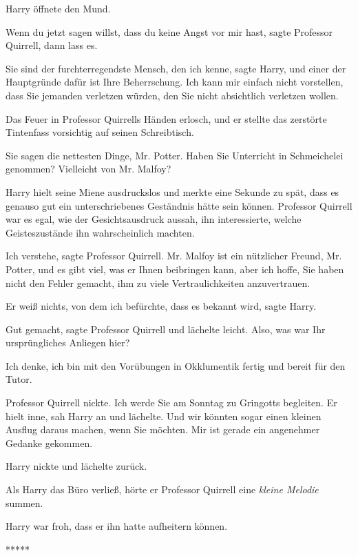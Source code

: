 Harry öffnete den Mund.

\glqq{}Wenn du jetzt sagen willst, dass du keine Angst vor mir hast\grqq{},
sagte Professor Quirrell, \glqq{}dann lass es.\grqq{}

\glqq{}Sie sind der furchterregendste Mensch, den ich kenne\grqq{}, sagte Harry,
\glqq{}und einer der Hauptgründe dafür ist Ihre Beherrschung. Ich kann mir
einfach nicht vorstellen, dass Sie jemanden verletzen würden, den Sie nicht
absichtlich verletzen wollen.\grqq{}

Das Feuer in Professor Quirrells Händen erlosch, und er stellte das zerstörte
Tintenfass vorsichtig auf seinen Schreibtisch.

\glqq{}Sie sagen die nettesten Dinge, Mr. Potter. Haben Sie Unterricht in
Schmeichelei genommen? Vielleicht von Mr. Malfoy?\grqq{}

Harry hielt seine Miene ausdruckslos und merkte eine Sekunde zu spät, dass es
genauso gut ein unterschriebenes Geständnis hätte sein können. Professor
Quirrell war es egal, wie der Gesichtsausdruck aussah, ihn interessierte, welche
Geisteszustände ihn wahrscheinlich machten.

\glqq{}Ich verstehe\grqq{}, sagte Professor Quirrell. \glqq{}Mr. Malfoy ist ein
nützlicher Freund, Mr. Potter, und es gibt viel, was er Ihnen beibringen kann,
aber ich hoffe, Sie haben nicht den Fehler gemacht, ihm zu viele
Vertraulichkeiten anzuvertrauen.\grqq{}

\glqq{}Er weiß nichts, von dem ich befürchte, dass es bekannt wird\grqq{}, sagte
Harry.

\glqq{}Gut gemacht\grqq{}, sagte Professor Quirrell und lächelte leicht. \glqq{}
Also, was war Ihr ursprüngliches Anliegen hier?\grqq{}

\glqq{}Ich denke, ich bin mit den Vorübungen in Okklumentik fertig und bereit
für den Tutor.\grqq{}

Professor Quirrell nickte. \glqq{}Ich werde Sie am Sonntag zu Gringotts
begleiten.\grqq{} Er hielt inne, sah Harry an und lächelte. \glqq{}Und wir
könnten sogar einen kleinen Ausflug daraus machen, wenn Sie möchten. Mir ist
gerade ein angenehmer Gedanke gekommen.\grqq{}

Harry nickte und lächelte zurück.

Als Harry das Büro verließ, hörte er Professor Quirrell eine \emph{kleine
Melodie} summen.

Harry war froh, dass er ihn hatte aufheitern können.

\begin{center}*****\end{center}

